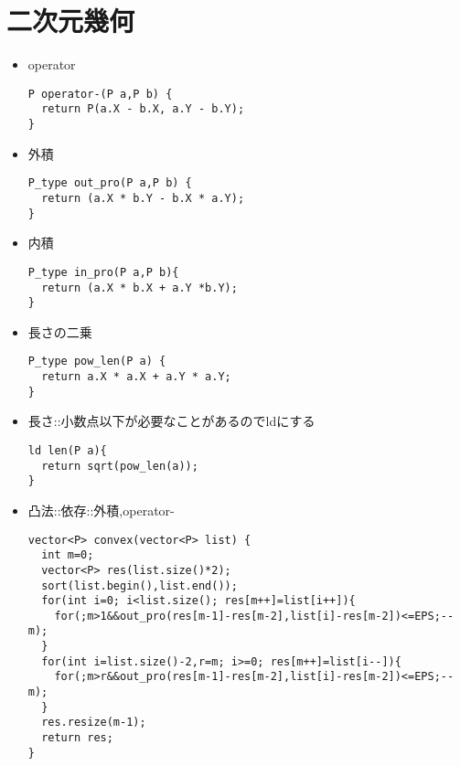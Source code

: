 \documentclass{jsarticle}
\begin{document}
\section{二次元幾何}
  \begin{itemize}
\begin{lstlisting}
#define X first
#define Y second

typedef long double ld;
typedef long long ll;
typedef ll P_type;
typedef pair<ll,ll> P;

const ld INF = 1e39;
const ld EPS = 1e-8;
const ld  PI = acos(-1);
\end{lstlisting}
\item operator
\begin{lstlisting}
P operator-(P a,P b) {
  return P(a.X - b.X, a.Y - b.Y);
}
\end{lstlisting}
\item 外積
\begin{lstlisting}
P_type out_pro(P a,P b) {
  return (a.X * b.Y - b.X * a.Y);
}
\end{lstlisting}
\item 内積
\begin{lstlisting}
P_type in_pro(P a,P b){
  return (a.X * b.X + a.Y *b.Y);
}
\end{lstlisting}

\item 長さの二乗
\begin{lstlisting}
P_type pow_len(P a) {
  return a.X * a.X + a.Y * a.Y;
}
\end{lstlisting}
\item 長さ::小数点以下が必要なことがあるのでldにする
\begin{lstlisting}
ld len(P a){
  return sqrt(pow_len(a));
}
\end{lstlisting}
\item 凸法::依存::外積,operator-
\begin{lstlisting}
vector<P> convex(vector<P> list) {
  int m=0;
  vector<P> res(list.size()*2);
  sort(list.begin(),list.end());
  for(int i=0; i<list.size(); res[m++]=list[i++]){
    for(;m>1&&out_pro(res[m-1]-res[m-2],list[i]-res[m-2])<=EPS;--m);
  }
  for(int i=list.size()-2,r=m; i>=0; res[m++]=list[i--]){
    for(;m>r&&out_pro(res[m-1]-res[m-2],list[i]-res[m-2])<=EPS;--m);
  }
  res.resize(m-1);
  return res;
}
\end{lstlisting}

\clearpage

\end{itemize}
\end{document}
